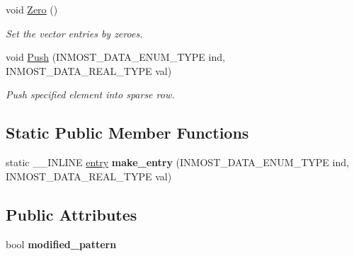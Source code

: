 \begin{DoxyCompactItemize}
\item 
\hypertarget{classINMOST_1_1Solver_1_1Row_af7022d7b2c223927e07b22f43584c93b}{void \hyperlink{classINMOST_1_1Solver_1_1Row_af7022d7b2c223927e07b22f43584c93b}{Zero} ()}\label{classINMOST_1_1Solver_1_1Row_af7022d7b2c223927e07b22f43584c93b}

\begin{DoxyCompactList}\small\item\em Set the vector entries by zeroes. \end{DoxyCompactList}\item 
void \hyperlink{classINMOST_1_1Solver_1_1Row_af5a53ab2f8e8febc9ce3196ff054cb01}{Push} (I\-N\-M\-O\-S\-T\-\_\-\-D\-A\-T\-A\-\_\-\-E\-N\-U\-M\-\_\-\-T\-Y\-P\-E ind, I\-N\-M\-O\-S\-T\-\_\-\-D\-A\-T\-A\-\_\-\-R\-E\-A\-L\-\_\-\-T\-Y\-P\-E val)
\begin{DoxyCompactList}\small\item\em Push specified element into sparse row. \end{DoxyCompactList}\end{DoxyCompactItemize}
\subsection*{Static Public Member Functions}
\begin{DoxyCompactItemize}
\item 
\hypertarget{classINMOST_1_1Solver_1_1Row_a709889bdf720d73e7aa874b5b6a0d231}{static \-\_\-\-\_\-\-I\-N\-L\-I\-N\-E \hyperlink{classINMOST_1_1Solver_1_1Row_a83f9b826189f21abd7ad395608901825}{entry} {\bfseries make\-\_\-entry} (I\-N\-M\-O\-S\-T\-\_\-\-D\-A\-T\-A\-\_\-\-E\-N\-U\-M\-\_\-\-T\-Y\-P\-E ind, I\-N\-M\-O\-S\-T\-\_\-\-D\-A\-T\-A\-\_\-\-R\-E\-A\-L\-\_\-\-T\-Y\-P\-E val)}\label{classINMOST_1_1Solver_1_1Row_a709889bdf720d73e7aa874b5b6a0d231}

\end{DoxyCompactItemize}
\subsection*{Public Attributes}
\begin{DoxyCompactItemize}
\item 
\hypertarget{classINMOST_1_1Solver_1_1Row_a417f7f35421de05227023d03a1c9c095}{bool {\bfseries modified\-\_\-pattern}}\label{classINMOST_1_1Solver_1_1Row_a417f7f35421de05227023d03a1c9c095}

\end{DoxyCompactItemize}


